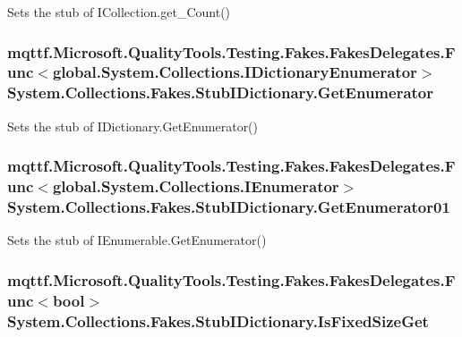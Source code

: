 Sets the stub of I\-Collection.\-get\-\_\-\-Count()

\hypertarget{class_system_1_1_collections_1_1_fakes_1_1_stub_i_dictionary_a9d606078febd3c0e3f12ba0fe6c0121a}{
\subsubsection[{Get\-Enumerator}]{\setlength{\rightskip}{0pt plus 5cm}mqttf.\-Microsoft.\-Quality\-Tools.\-Testing.\-Fakes.\-Fakes\-Delegates.\-Func$<$global.\-System.\-Collections.\-I\-Dictionary\-Enumerator$>$ System.\-Collections.\-Fakes.\-Stub\-I\-Dictionary.\-Get\-Enumerator}}\label{class_system_1_1_collections_1_1_fakes_1_1_stub_i_dictionary_a9d606078febd3c0e3f12ba0fe6c0121a}


Sets the stub of I\-Dictionary.\-Get\-Enumerator()

\hypertarget{class_system_1_1_collections_1_1_fakes_1_1_stub_i_dictionary_a4d8e77aa063e559a5daee36842c55f24}{
\subsubsection[{Get\-Enumerator01}]{\setlength{\rightskip}{0pt plus 5cm}mqttf.\-Microsoft.\-Quality\-Tools.\-Testing.\-Fakes.\-Fakes\-Delegates.\-Func$<$global.\-System.\-Collections.\-I\-Enumerator$>$ System.\-Collections.\-Fakes.\-Stub\-I\-Dictionary.\-Get\-Enumerator01}}\label{class_system_1_1_collections_1_1_fakes_1_1_stub_i_dictionary_a4d8e77aa063e559a5daee36842c55f24}


Sets the stub of I\-Enumerable.\-Get\-Enumerator()

\hypertarget{class_system_1_1_collections_1_1_fakes_1_1_stub_i_dictionary_a0f1a9120cc145ce9144cd3aca2fa94d7}{
\subsubsection[{Is\-Fixed\-Size\-Get}]{\setlength{\rightskip}{0pt plus 5cm}mqttf.\-Microsoft.\-Quality\-Tools.\-Testing.\-Fakes.\-Fakes\-Delegates.\-Func$<$bool$>$ System.\-Collections.\-Fakes.\-Stub\-I\-Dictionary.\-Is\-Fixed\-Size\-Get}}\label{class_system_1_1_collections_1_1_fakes_1_1_stub_i_dictionary_a0f1a9120cc145ce9144cd3aca2fa94d7}


